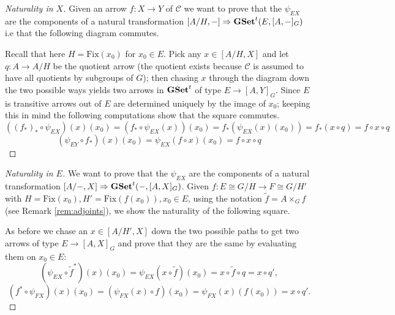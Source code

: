\documentclass[italian, 12pt, reqno]{article}
\theoremstyle{myteo}
\numberwithin{equation}{section}
\newcommand{\cat}[1]{\mathscr{#1}}
\newcommand{\gset}{\text{\textbf{GSet}}}
\newcommand{\tgset}{\text{\textbf{GSet}}^t}
\newcommand{\fix}[1]{\text{Fix}(#1)}
\newcommand{\homs}[2]{[#1, #2]}
\newcommand{\fun}[3]{#1\colon#2\to #3}
\begin{document}
\begin{proof}[Naturality in \(X\)]
  \label{proof:naturality_in_X}
  Given an arrow \(\fun{f}{X}{Y}\) of \(\cat{C}\) we want to prove that the \(\psi_{EX}\) are the components of a natural transformation \(\homs{A/H}{-}\Rightarrow \tgset(E, \homs{A}{-}_G)\) i.e that the following diagram commutes.
  \begin{center}
  \end{center}
  Recall that here \(H = \fix{x_0}\) for \(x_0\in E\).
  Pick any \(x\in \homs{A/H}{X}\) and let \(\fun{q}{A}{A/H}\) be the quotient arrow (the quotient exists because \(\cat{C}\) is assumed to have all quotients by subgroups of \(G\)); then chasing \(x\) through the diagram down the two possible ways yields two arrows in \(\tgset\) of type \(E\to\homs{A}{Y}_G\).
  Since \(E\) is transitive arrows out of \(E\) are determined uniquely by the image of \(x_0\); keeping this in mind the following computations show that the square commutes.
  \[((f_*)_*\circ \psi_{EX})(x)(x_0) = (f_*\circ \psi_{EX}(x))(x_0) = f_*(\psi_{EX}(x)(x_0)) = f_*(x\circ q) = f\circ x\circ q\]
  \[(\psi_{EY}\circ f_*)(x)(x_0) = \psi_{EX}(f\circ x)(x_0) = f\circ x\circ q\]
\end{proof}

\begin{proof}[Naturality in \(E\)]
  \label{proof:naturality_in_E}
  We want to prove that the \(\psi_{EX}\) are the components of a natural transformation \(\homs{A/-}{X}\Rightarrow\tgset(-, \homs{A}{X}_G)\).
	Given \(\fun{f}{E\cong G/H}{F\cong G/H'}\) with \(H=\text{Fix}(x_0), H'=\text{Fix}(f(x_0)), x_0\in E\), using the notation \(\tilde{f} = A\times_G f\) (see Remark \ref{rem:adjoints}), we show the naturality of the following square.
  \begin{center}
  \end{center}
  As before we chase an \(x\in\homs{A/H'}{X}\) down the two possible paths to get two arrows of type \(E\to\homs{A}{X}_G\) and prove that they are the same by evaluating them on \(x_0\in E\):
  \[(\psi_{EX}\circ \widetilde{f}^*)(x)(x_0) = \psi_{EX}(x\circ \widetilde{f})(x_0) = x\circ \widetilde{f}\circ q = x\circ q',\]
  \[(f^*\circ \psi_{FX})(x)(x_0) = (\psi_{FX}(x)\circ f)(x_0) = \psi_{FX}(x)(f(x_0)) = x\circ q'.\]
\end{proof}
\end{document}

